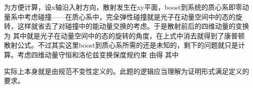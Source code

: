     为方便计算，设x轴沿入射方向，散射发生在xy平面，boost到系统的质心系即零动量系中考虑碰撞——在质心系中，完全弹性碰撞就是光子在动量空间中的态的旋转，这样就省去了对碰撞中的能动量交换的考虑。于是散射前后的四维动量的变换为
    其中就是光子在动量空间中的态的旋转的角度，在上式中消去就得到了康普顿散射公式。不过其实这里boost到质心系所需的\nota{\be,\ga}还是未知的，剩下的问题就只是计算\nota{\be,\ga}。考虑四维动量守恒和洛伦兹变换保度规约束
    由得
    其中


    实际上本身就是由规范不变性定义的。此题的逻辑应当理解为证明形式满足定义的要求。
    
